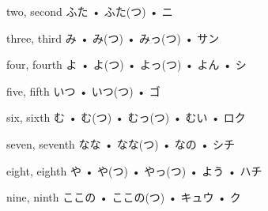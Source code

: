 



\setcounter{cardnum}{9}

		{two, second}
		{ふた • ふた(つ) • ニ}
		{}{}
		{}{}
		{}{}
		{}{}
		{}{}

		{three, third}
		{み • み(つ) • みっ(つ) • サン}
		{}{}
		{}{}
		{}{}
		{}{}
		{}{}

		{four, fourth}
		{よ • よ(つ)  • よっ(つ)  • よん  • シ}
		{}{}
		{}{}
		{}{}
		{}{}
		{}{}

		{five, fifth}
		{いつ • いつ(つ) • ゴ}
		{}{}
		{}{}
		{}{}
		{}{}
		{}{}

		{six, sixth}
		{む • む(つ) • むっ(つ) • むい • ロク}
		{}{}
		{}{}
		{}{}
		{}{}
		{}{}

		{seven, seventh}
		{なな • なな(つ) • なの • シチ}
		{}{}
		{}{}
		{}{}
		{}{}
		{}{}

		{eight, eighth}
		{や • や(つ) • やっ(つ) • よう • ハチ}
		{}{}
		{}{}
		{}{}
		{}{}
		{}{}

		{nine, ninth}
		{ここの • ここの(つ) • キュウ • ク}
		{}{}
		{}{}
		{}{}
		{}{}
		{}{}


